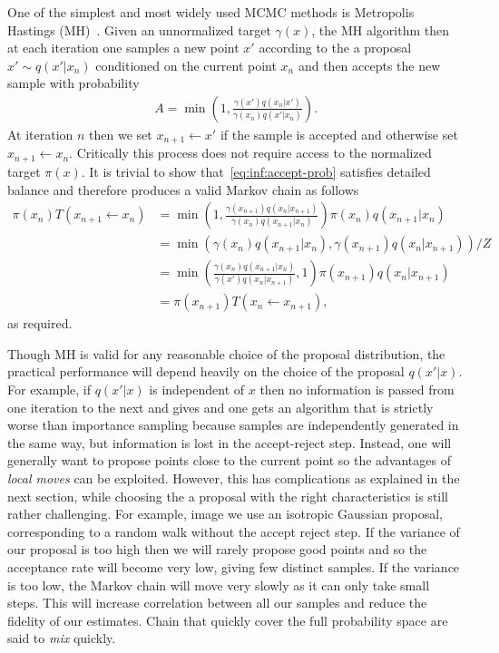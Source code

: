 One of the simplest and most widely used MCMC methods is Metropolis Hastings (MH)~\cite{hastings1970monte}.
Given an unnormalized target $\gamma(x)$, the MH algorithm then at each iteration one samples 
a new point $x'$ according to the a proposal $x' \sim q(x' | x_n)$ conditioned on the current point $x_n$ 
and then accepts the new sample with probability
\begin{align}
\label{eq:inf:accept-prob}
A = \min \left(1, \frac{\gamma(x') q(x_n | x')}{\gamma(x_n) q(x' | x_n)}\right).
\end{align}
At iteration $n$ then we set $x_{n+1} \leftarrow x'$ if the sample is accepted and otherwise
set $x_{n+1} \leftarrow x_{n}$.  Critically this process does not require access to the normalized
target $\pi(x)$.  It is trivial to show that~\eqref{eq:inf:accept-prob} satisfies detailed
balance and therefore produces a valid Markov chain as follows
\begin{align*}
\pi(x_n) T(x_{n+1} \leftarrow x_n) &= \min \left(1, \frac{\gamma(x_{n+1}) q(x_n | x_{n+1})}{\gamma(x_n) q(x_{n+1} | x_n)}\right)
\pi(x_n) q(x_{n+1} | x_n) \\
&= \min \left(\gamma(x_n) q(x_{n+1} | x_n),\gamma(x_{n+1}) q(x_n | x_{n+1})\right) / Z \\
&= \min \left(\frac{\gamma(x_n) q(x_{n+1} | x_n)}{\gamma(x') q(x_n | x_{n+1})},1\right) \pi(x_{n+1}) q(x_n | x_{n+1}) \\
&=\pi(x_{n+1}) T(x_n \leftarrow x_{n+1}),
\end{align*}
as required.

Though MH is valid for any reasonable choice of the proposal distribution,
the practical performance will depend heavily on the choice of the proposal $q(x'|x)$.
For example, if $q(x'|x)$ is independent of $x$ then no information is passed from one iteration
to the next and gives and one gets an algorithm that is strictly worse than importance sampling
because samples are independently generated in the same way, but information is lost in the accept-reject
step.  Instead, one will generally want to propose points close to the current point so the advantages
of \emph{local moves} can be exploited.  However, this has complications as explained in the next
section, while choosing the a proposal with the right characteristics is still rather challenging.
For example, image we use an isotropic Gaussian proposal, corresponding to a random walk without the
accept reject step.  If the variance of our proposal is too high then we will rarely propose good points
and so the acceptance rate will become very low, giving few distinct samples.  If the variance is too low,
the Markov chain will move very slowly as it can only take small steps.  This will increase correlation
between all our samples and reduce the fidelity of our estimates.  Chain that quickly cover the full
probability space are said to \emph{mix} quickly.

